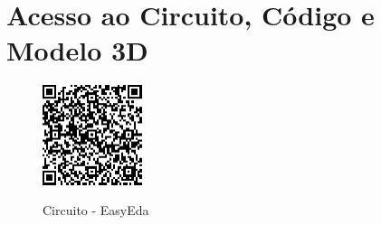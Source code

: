 

\chapter{Acesso ao Circuito, Código e Modelo 3D}\label{apendice-a}







\begin{figure}[htb!]
    \caption{Circuito - EasyEda}
    \label{fig:circ-apendice}
    \href{https://easyeda.com/editor#project_id=21fb0fd04816405b880d222f8612ec80}{\includegraphics[width=0.26\textwidth]{figuras/easy-eda-qr-code.png}
    }
    \fonte{}
  \end{figure}
  
